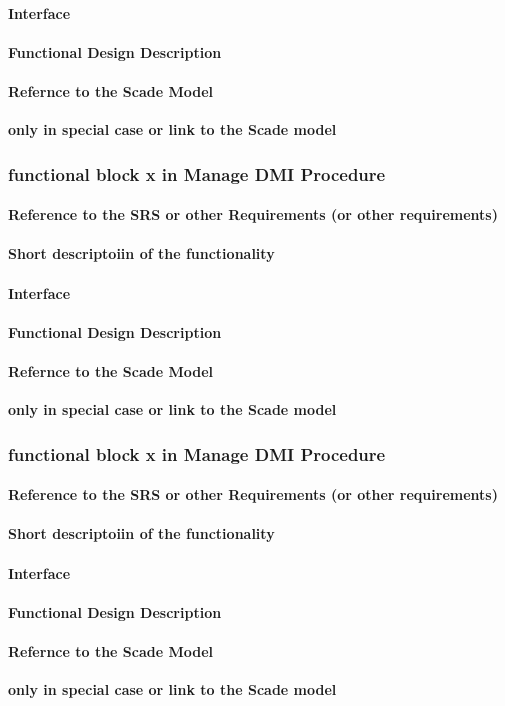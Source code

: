 \paragraph{Interface}
\paragraph{Functional Design Description}
\paragraph{Refernce to the Scade Model}
\textbf{only in special case or link to the Scade model}

\subsubsection{functional block x in Manage DMI Procedure}%
\paragraph{Reference to the SRS or other Requirements (or other requirements)}
\paragraph{Short descriptoiin of the functionality}
\paragraph{Interface}
\paragraph{Functional Design Description}
\paragraph{Refernce to the Scade Model}
\textbf{only in special case or link to the Scade model}

\subsubsection{functional block x in Manage DMI Procedure}%
\paragraph{Reference to the SRS or other Requirements (or other requirements)}
\paragraph{Short descriptoiin of the functionality}
\paragraph{Interface}
\paragraph{Functional Design Description}
\paragraph{Refernce to the Scade Model}
\textbf{only in special case or link to the Scade model}

